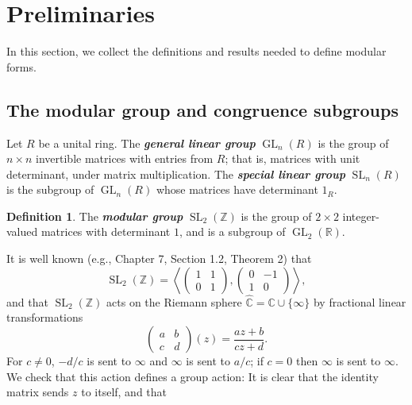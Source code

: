 \documentclass[10pt,leqno]{article}
\theoremstyle{plain}
\theoremstyle{definition}
\newtheorem{definition}[lem]{Definition}
\numberwithin{equation}{section}
\numberwithin{lem}{section}
\newcommand{\textib}[1]{\textbf{\textit{#1}}}
\DeclareMathOperator{\GL}{GL}
\DeclareMathOperator{\SL}{SL}
\newcommand{\abcd}{\begin{pmatrix}
    a & b \\ c & d
\end{pmatrix}}
\newcommand{\slz}{\SL_2(\mathbb{Z})}
\begin{document}
\newpage\section{Preliminaries} In this section, we collect the definitions and results needed to define modular forms.
\subsection{The modular group and congruence subgroups}
Let $R$ be a unital ring. The \textib{general linear group} $\GL_n(R)$ is the group of $n\times n$ invertible matrices with entries from $R$; that is, matrices with unit determinant, under matrix multiplication. The \textib{special linear group} $\SL_n(R)$ is the subgroup of $\GL_n(R)$ whose matrices have determinant $1_R$.

\begin{definition}
    The \textib{modular group} $\slz$ is the group of $2\times 2$ integer-valued matrices with determinant $1$, and is a subgroup of $\GL_2(\mathbb{R})$.
\end{definition} 
It is well known (e.g., \cite{serre} Chapter 7, Section 1.2, Theorem 2) that 
\begin{equation}\label{eq: generators modular group}
    \slz = \left\langle\begin{pmatrix}
        1 & 1 \\ 0 & 1
    \end{pmatrix}, \begin{pmatrix}
        0 & -1 \\ 1 & 0
    \end{pmatrix}\right\rangle, 
\end{equation}
and that $\slz$ acts on the Riemann sphere $\widehat{\mathbb{C}} = \mathbb{C}\cup \{\infty\}$ by fractional linear transformations
\[\abcd(z) = \frac{az + b}{cz + d}.\] For $c\neq 0$, $-d/c$ is sent to $\infty$ and $\infty$ is sent to $a/c$; if $c = 0$ then $\infty$ is sent to $\infty$. We check that this action defines a group action: It is clear that the identity matrix sends $z$ to itself, and that 
\end{document}
